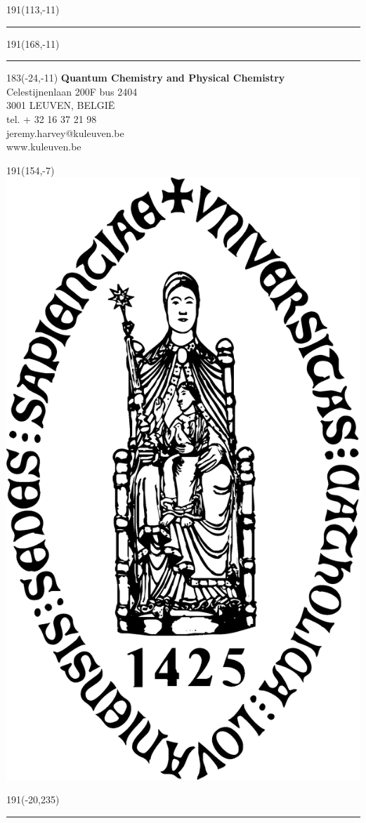 \documentclass[12pt,a4paper,oneside]{book}
\begin{document}
\newpage
\thispagestyle{empty}
\sffamily
%
\begin{textblock}{191}(113,-11)
{\color{blueline}\rule{160pt}{5.5pt}}
\end{textblock}
%
\begin{textblock}{191}(168,-11)
{\color{blueline}\rule{5.5pt}{59pt}}
\end{textblock}
%
\begin{textblock}{183}(-24,-11)
\textblockcolour{}
\flushright
\fontsize{7}{7.5}\selectfont
\textbf{Quantum Chemistry and Physical Chemistry}\\
Celestijnenlaan 200F bus 2404\\
3001 LEUVEN, BELGI\"{E}\\
tel. + 32 16 37 21 98\\
jeremy.harvey@kuleuven.be\\
www.kuleuven.be\\
\end{textblock}
%
\begin{textblock}{191}(154,-7)
\textblockcolour{}
\includegraphics*[height=16.5truemm]{sedes}
\end{textblock}
%
\begin{textblock}{191}(-20,235)
{\color{bluetitle}\rule{544pt}{55pt}}
\end{textblock}
\end{document}
